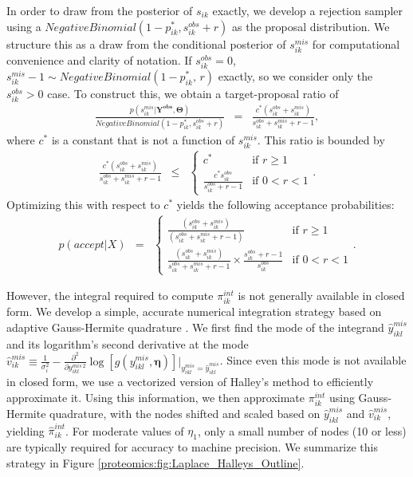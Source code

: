 
In order to draw from the posterior of $s_{ik}$ exactly, we develop a rejection sampler using a $NegativeBinomial(1 - p_{ik}^*, s_{ik}^{obs} + r)$ as the proposal distribution.
We structure this as a draw from the conditional posterior of $s_{ik}^{mis}$ for computational convenience and clarity of notation.
If $s_{ik}^{obs}=0$, $s_{ik}^{mis} - 1 \sim NegativeBinomial(1-p_{ik}^*, \, r)$ exactly, so we consider only the $s_{ik}^{obs} > 0$ case.
To construct this, we obtain a target-proposal ratio of 
\begin{eqnarray*}
\frac{p(s_{ik}^{mis}\vert \bm{Y^{obs}}, \bm{\Theta})}{NegativeBinomial(1-p_{ik}^{*},s_{ik}^{obs}+r)} & = & \frac{c^{*}(s_{ik}^{obs}+s_{ik}^{mis})}{s_{ik}^{obs}+s_{ik}^{mis}+r-1},
\end{eqnarray*}
where $c^{*}$ is a constant that is not a function of $s_{ik}^{mis}$.
This ratio is bounded by
\begin{eqnarray*}
\frac{c^{*}(s_{ik}^{obs}+s_{ik}^{mis})}{s_{ik}^{obs}+s_{ik}^{mis}+r-1} & \leq & \begin{cases}
c^{*} & \text{if }r\geq1\\
\frac{c^{*}s_{ik}^{obs}}{s_{ik}^{obs}+r-1} & \text{if }0<r<1
\end{cases}.
\end{eqnarray*}
Optimizing this with respect to $c^*$ yields the following acceptance probabilities:
\begin{eqnarray*}
p(accept \vert X) & = & \begin{cases}
\frac{(s_{ik}^{obs}+s_{ik}^{mis})}{(s_{ik}^{obs}+s_{ik}^{mis}+r-1)} & \text{if }r\geq1\\
\frac{(s_{ik}^{obs}+s_{ik}^{mis})}{s_{ik}^{obs}+s_{ik}^{mis}+r-1} \times \frac{s_{ik}^{obs}+r-1}{s_{ik}^{obs}} & \text{if }0<r<1
\end{cases}.
\end{eqnarray*}

However, the integral required to compute $\pi_{ik}^{int}$ is not generally available in closed form.
We develop a simple, accurate numerical integration strategy based on adaptive Gauss-Hermite quadrature \citep{Liu1994}.
We first find the mode of the integrand $\hat{y}^{mis}_{ikl}$ and its logarithm's second derivative at the mode $\hat{v}_{ik}^{mis} \equiv \frac{1}{\sigma_i^2} - \frac{\partial^2}{\partial y_{ikl}^{mis\,2}}\log\left[g(y_{ikl}^{mis}, \bm \eta) \right] \Big|_{y_{ikl}^{mis} = \hat{y}^{mis}_{ikl}}$.
Since even this mode is not available in closed form, we use a vectorized version of Halley's method to efficiently approximate it.
Using this information, we then approximate $\pi_{ik}^{int}$ using Gauss-Hermite quadrature, with the nodes shifted and scaled based on $\hat{y}^{mis}_{ikl}$ and $\hat{v}_{ik}^{mis}$, yielding $\hat{\pi}_{ik}^{int}$.
For moderate values of $\eta_1$, only a small number of nodes (10 or less) are typically required for accuracy to machine precision.
We summarize this strategy in Figure \ref{proteomics:fig:Laplace_Halleys_Outline}.%

